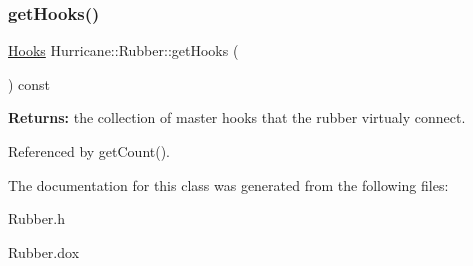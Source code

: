 \subsubsection{\texorpdfstring{get\+Hooks()}{getHooks()}}
{\footnotesize\ttfamily \hyperlink{namespaceHurricane_a9dcd9b74dc5e2b51bec7a13c25807e02}{Hooks} Hurricane\+::\+Rubber\+::get\+Hooks (\begin{DoxyParamCaption}{ }\end{DoxyParamCaption}) const}

{\bfseries Returns\+:} the collection of master hooks that the rubber virtualy connect. 

Referenced by get\+Count().



The documentation for this class was generated from the following files\+:\begin{DoxyCompactItemize}
\item 
Rubber.\+h\item 
Rubber.\+dox\end{DoxyCompactItemize}
